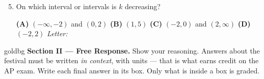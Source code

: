 \documentclass[10pt]{article}
\begin{document}
\begin{enumerate}[leftmargin=1.9em, itemsep=8pt]
\setcounter{enumi}{4}
\item On which interval or intervals is $k$ decreasing?

      \smallskip
      \textbf{(A)} $(-\infty, -2)$ and $(0, 2)$ \hspace{1.2em} \textbf{(B)} $(1, 5)$ \hspace{1.2em}
      \textbf{(C)} $(-2, 0)$ and $(2, \infty)$ \hspace{1.2em} \textbf{(D)} $(-2, 2)$ \hfill\textit{Letter:}~\gradedblank[id=ap5, type=choice, points=1, answer=C]{0.42in}{13pt}

\end{enumerate}

\newpage

\begin{headlinebox}{goldbg}
\small
\textbf{Section II --- Free Response.} Show your reasoning. Answers about the festival must be
written \emph{in context}, with units --- that is what earns credit on the AP exam. Write each final answer in its box. Only what is inside a box is graded.
\end{headlinebox}

\vspace{0.08in}
\end{document}
